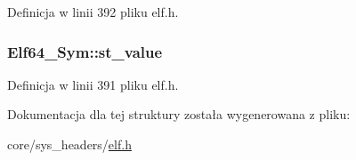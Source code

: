 Definicja w linii 392 pliku elf.\-h.

\hypertarget{struct_elf64___sym_a9601295da4c2e81cc18c1f777609e1bf}{
\subsubsection[{st\-\_\-value}]{ Elf64\-\_\-\-Sym\-::st\-\_\-value}}\label{struct_elf64___sym_a9601295da4c2e81cc18c1f777609e1bf}


Definicja w linii 391 pliku elf.\-h.



Dokumentacja dla tej struktury została wygenerowana z pliku\-:\begin{DoxyCompactItemize}
\item 
core/sys\-\_\-headers/\hyperlink{elf_8h}{elf.\-h}\end{DoxyCompactItemize}
